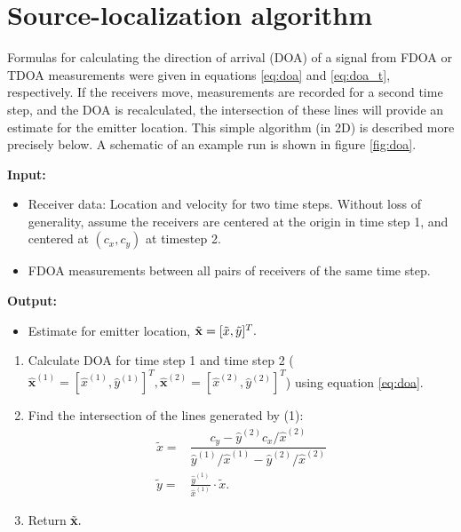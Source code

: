 \section{Source-localization algorithm}
\label{s:algorithm}
Formulas for calculating the direction of arrival (DOA) of a signal from FDOA or TDOA measurements were given in equations \ref{eq:doa} and \ref{eq:doa_t}, respectively. If the receivers move, measurements are recorded for a second time step, and the DOA is recalculated, the intersection of these lines will provide an estimate for the emitter location. This simple algorithm (in 2D) is described more precisely below. A schematic of an example run is shown in figure \ref{fig:doa}.
\begin{framed}
\noindent\textbf{Input:}
\begin{itemize}
  \item Receiver data: Location and velocity for two time steps. Without loss of generality, assume the receivers are centered at the origin in time step 1, and centered at $(c_x,c_y)$ at timestep 2.
  \item FDOA measurements between all pairs of receivers of the same time step.
\end{itemize}
\textbf{Output:}
\begin{itemize}
  \item Estimate for emitter location, $\tilde{\mathbf{x}}=[\tilde{x},\tilde{y}]^T.$
\end{itemize}
\vspace{1ex}
\begin{enumerate}
  \item Calculate DOA for time step 1 and time step 2 ($\hat{\mathbf{x}}^{(1)}=[\hat{x}^{(1)},\hat{y}^{(1)}]^T,\hat{\mathbf{x}}^{(2)}=[\hat{x}^{(2)},\hat{y}^{(2)}]^T$) using equation \ref{eq:doa}.
  \item Find the intersection of the lines generated by (1):
  \begin{align*}
    \tilde{x} =& \dfrac{c_y - \hat{y}^{(2)}c_x/\hat{x}^{(2)}}{\hat{y}^{(1)}/\hat{x}^{(1)}-\hat{y}^{(2)}/\hat{x}^{(2)}} \\
    \tilde{y} =& \frac{\hat{y}^{(1)}}{\hat{x}^{(1)}}\cdot\tilde{x}.
  \end{align*}
  \item Return $\tilde{\mathbf{x}}.$
\end{enumerate}
\end{framed}

